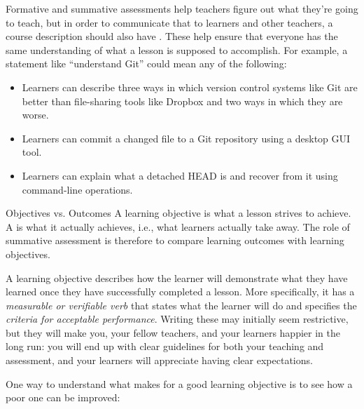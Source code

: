 
Formative and summative assessments help teachers figure out what they're going to teach,
but in order to communicate that to learners and other teachers,
a course description should also have
.
These help ensure that
everyone has the same understanding of what a lesson is supposed to accomplish.
For example,
a statement like ``understand Git'' could mean any of the following:

\begin{itemize}

\item
  Learners can describe three ways
  in which version control systems like Git are better than file-sharing tools like Dropbox
  and two ways in which they are worse.

\item
  Learners can commit a changed file to a Git repository
  using a desktop GUI tool.

\item
  Learners can explain what a detached HEAD is
  and recover from it using command-line operations.

\end{itemize}

\begin{aside}{Objectives vs. Outcomes}
  A learning objective is what a lesson strives to achieve.
  A  is what it actually achieves,
  i.e., what learners actually take away.
  The role of summative assessment is therefore
  to compare learning outcomes with learning objectives.
\end{aside}

A learning objective describes how the learner will demonstrate what they have learned
once they have successfully completed a lesson.
More specifically,
it has a \emph{measurable or verifiable verb} that states what the learner will do
and specifies the \emph{criteria for acceptable performance}.
Writing these may initially seem restrictive,
but they will make you,
your fellow teachers,
and your learners happier in the long run:
you will end up with clear guidelines for both your teaching and assessment,
and your learners will appreciate having clear expectations.

One way to understand what makes for a good learning objective
is to see how a poor one can be improved:

